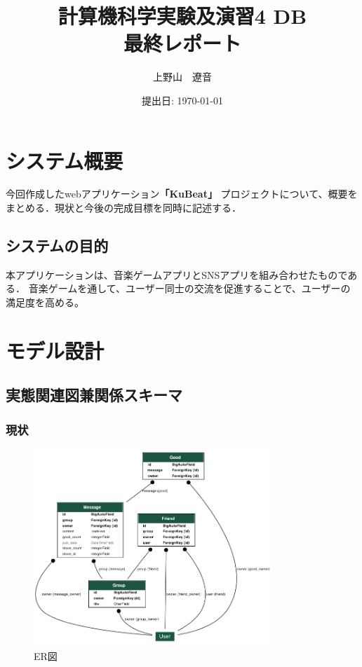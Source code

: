 \documentclass[a4j]{jarticle}
\begin{document}
\title{計算機科学実験及演習4 DB \\ \bf 最終レポート}
\author{上野山　遼音}
\date{提出日: \today} %
\maketitle
\tableofcontents
\clearpage
\section{システム概要}
 今回作成したwebアプリケーション{\bf「KuBeat」} プロジェクトについて、概要をまとめる．現状と今後の完成目標を同時に記述する．
\subsection{システムの目的}
  本アプリケーションは、音楽ゲームアプリとSNSアプリを組み合わせたものである．
  音楽ゲームを通して、ユーザー同士の交流を促進することで、ユーザーの満足度を高める。
\section{モデル設計}
\subsection{実態関連図兼関係スキーマ}
\subsubsection{現状}
\begin{figure}[htbp]
  \centering
  \includegraphics[width=0.8\textwidth,bb=0 0 800 600]{img/myer.png}
  \caption{ER図}
\end{figure}
\end{document}
